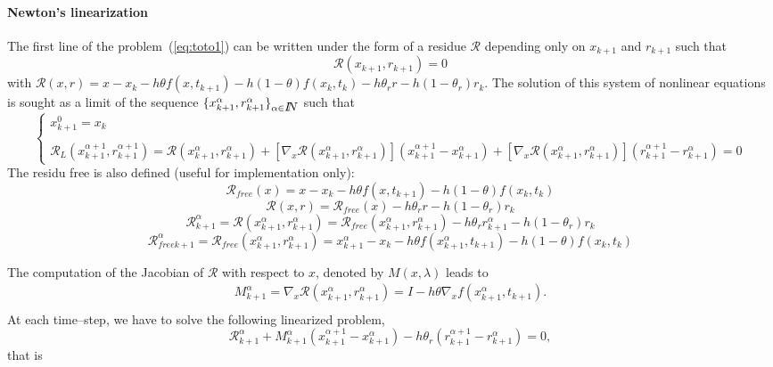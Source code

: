  \paragraph{Newton's linearization} The first line of the  problem~(\ref{eq:toto1}) can be written under the form of a residue $\mathcal R$ depending only on $x_{k+1}$ and $r_{k+1}$ such that 
\begin{equation}
  \label{eq:NL3}
  \mathcal R (x_{k+1},r _{k+1}) =0
\end{equation}
with $\mathcal R(x,r) = x - x_{k} -h\theta f( x , t_{k+1}) - h(1-\theta)f(x_k,t_k) - h\theta _r r
- h(1-\theta_r)r_k$.
The solution of this system of nonlinear equations is sought as a limit of the sequence $\{ x^{\alpha}_{k+1},r^{\alpha}_{k+1} \}_{\alpha \in \mbox{\rm $I\!\!N$}}$ such that
 \begin{equation}
   \label{eq:NL7}
   \begin{cases}
     x^{0}_{k+1} = x_k \\ \\
     \mathcal R_L( x^{\alpha+1}_{k+1},r^{\alpha+1}_{k+1}) = \mathcal
     R(x^{\alpha}_{k+1},r^{\alpha}_{k+1})  + \left[ \nabla_{x} \mathcal
     R(x^{\alpha}_{k+1},r^{\alpha}_{k+1})\right] (x^{\alpha+1}_{k+1}-x^{\alpha}_{k+1} ) +
     \left[ \nabla_{x} \mathcal R(x^{\alpha}_{k+1},r^{\alpha}_{k+1})\right] (r^{\alpha+1}_{k+1} - r^{\alpha}_{k+1} ) =0
 \end{cases}
\end{equation}
The residu free is also defined (useful for implementation only):
\[\mathcal R _{free}(x) =  x - x_{k} -h\theta f( x , t_{k+1}) - h(1-\theta)f(x_k,t_k)\]
\[\mathcal R (x,r) = \mathcal R _{free}(x)   - h\theta _r r - h(1-\theta_r)r_k\]
\[ \mathcal R^{\alpha}_{k+1} = \mathcal R (x^{\alpha}_{k+1},r^{\alpha}_{k+1}) = \mathcal R
_{free}(x^{\alpha}_{k+1},r^{\alpha}_{k+1} )  - h\theta _r r^{\alpha}_{k+1} - h(1-\theta_r)r_k\]
\[ \mathcal R _{free k+1} ^{\alpha} = \mathcal R
_{free}(x^{\alpha}_{k+1},r^{\alpha}_{k+1} )=x^{\alpha}_{k+1} - x_{k} -h\theta f( x^{\alpha}_{k+1} , t_{k+1}) - h(1-\theta)f(x_k,t_k)\]
 
The computation of the Jacobian of $\mathcal R$ with respect to $x$, denoted by $M(x,\lambda)$ leads to 
\begin{equation}
   \label{eq:NL9}
   \begin{array}{l}
    M^{\alpha}_{k+1}= \nabla_{x} \mathcal R (x^{\alpha}_{k+1},r^{\alpha}_{k+1})= I - h  \theta \nabla_{x} f(  x^{\alpha}_{k+1}, t_{k+1} ).\\
 \end{array}
\end{equation}
At each time--step, we have to solve the following linearized problem,
\begin{equation}
   \label{eq:NL10}
    \mathcal R^{\alpha}_{k+1} + M^{\alpha}_{k+1} (x^{\alpha+1}_{k+1} -
    x^{\alpha}_{k+1}) - h \theta _r (r^{\alpha+1}_{k+1} - r^{\alpha}_{k+1} )  =0 ,
\end{equation}
that is

